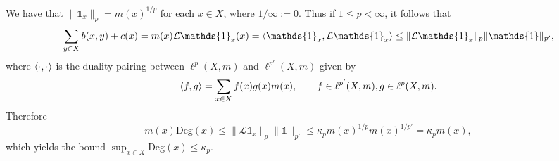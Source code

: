 We have that $\|\mathds{1}_x\|_p=m(x)^{1/p}$ for each $x\in X$, where $1/\infty := 0$. Thus if $1\le p<\infty$, it follows that
\begin{equation*}
	\sum_{y\in X}b(x,y) + c(x) = m(x)\mathcal{L}\mathds{1}_x(x) = \braket{\mathds{1}_x, \mathcal{L}\mathds{1}_x} \le \|\mathcal{L}\mathds{1}_x\|_p \|\mathds{1}\|_{p'},
\end{equation*}
where $\braket{\cdot, \cdot}$ is the duality pairing between $\ell^p(X,m)$ and $\ell^{p'}(X,m)$ given by
\begin{equation*}
	\braket{f,g} = \sum_{x\in X}f(x)g(x)m(x), \qquad f\in \ell^{p'}(X,m), g\in \ell^p(X,m).
\end{equation*}
Therefore
\begin{equation}
	m(x)\mathrm{Deg}(x) \le \|\mathcal{L}\mathds{1}_x\|_p \|\mathds{1}\|_{p'} \le \kappa_p m(x)^{1/p}m(x)^{1/p'} = \kappa_p m(x),
\end{equation}
which yields the bound $\sup_{x\in X}\mathrm{Deg}(x) \le \kappa_p$.